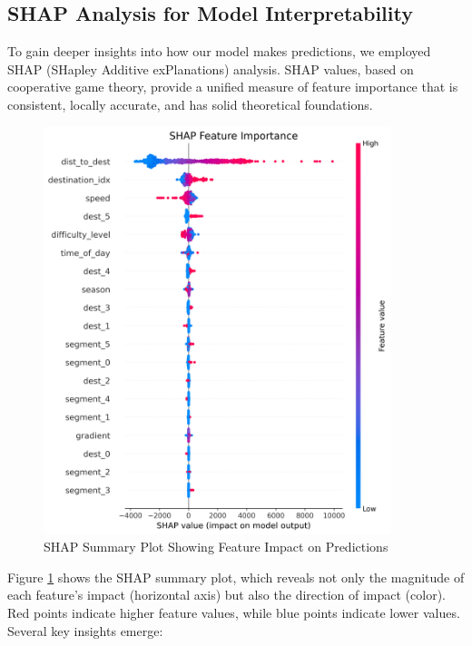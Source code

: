 \documentclass[12pt]{article}
\begin{document}
\subsection{SHAP Analysis for Model Interpretability}

To gain deeper insights into how our model makes predictions, we employed SHAP (SHapley Additive exPlanations) analysis. SHAP values, based on cooperative game theory, provide a unified measure of feature importance that is consistent, locally accurate, and has solid theoretical foundations.

\begin{figure}[H]
\centering
\includegraphics[width=0.9\textwidth]{visualization_results/shap_summary_plot.png}
\caption{SHAP Summary Plot Showing Feature Impact on Predictions}
\label{fig:shap_summary}
\end{figure}

Figure \ref{fig:shap_summary} shows the SHAP summary plot, which reveals not only the magnitude of each feature's impact (horizontal axis) but also the direction of impact (color). Red points indicate higher feature values, while blue points indicate lower values. Several key insights emerge:
\end{document}
